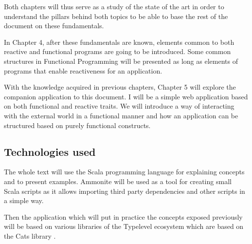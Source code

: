 \documentclass[../main.tex]{subfiles}
\begin{document}
Both chapters will thus serve as a study of the state of the art in order to understand the
pillars behind both topics to be able to base the rest of the document on these fundamentals.

In Chapter 4, after these fundamentals are known, elements common to
both reactive and functional programs are going to be introduced. Some common structures in
Functional Programming will be presented as long as elements of programs that enable reactiveness 
for an application.

With the knowledge acquired in previous chapters, Chapter 5 will explore the
companion application to this document. I will be a simple web application based on
both functional and reactive traits. We will introduce a way of interacting with
the external world in a functional manner and how an application can be
structured based on purely functional constructs.

\subsection{Technologies used}
The whole text will use the Scala programming language for explaining concepts
and to present examples. Ammonite \autocite{Ammonite} will be used as a tool for
creating small Scala scripts as it allows importing third party dependencies and
other scripts in a simple way.

Then the application which will put in practice the concepts exposed previously
will be based on various libraries of the Typelevel ecosystem
\autocite{2020Typelevel.scala} which are based on the Cats library \autocite{Cats:Home}.
\end{document}
